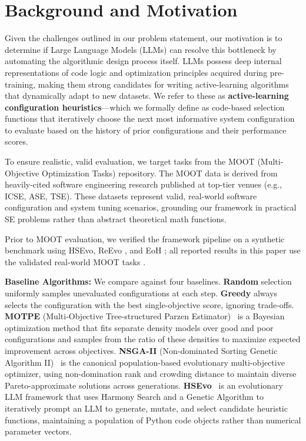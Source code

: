 \documentclass[sigconf,nonacm]{acmart}
\begin{document}
\section{Background and Motivation}

Given the challenges outlined in our problem statement, our motivation is to determine if Large Language Models (LLMs) can resolve this bottleneck by automating the algorithmic design process itself. LLMs possess deep internal representations of code logic and optimization principles acquired during pre-training, making them strong candidates for writing active-learning algorithms that dynamically adapt to new datasets. We refer to these as \textbf{active-learning configuration heuristics}---which we formally define as code-based selection functions that iteratively choose the next most informative system configuration to evaluate based on the history of prior configurations and their performance scores. 

To ensure realistic, valid evaluation, we target tasks from the MOOT (Multi-Objective Optimization Tasks) repository. The MOOT data is derived from heavily-cited software engineering research published at top-tier venues (e.g., ICSE, ASE, TSE). These datasets represent valid, real-world software configuration and system tuning scenarios, grounding our framework in practical SE problems rather than abstract theoretical math functions.

Prior to MOOT evaluation, we verified the framework pipeline on a synthetic benchmark using HSEvo, ReEvo \cite{reevo2024}, and EoH \cite{eoh2024}; all reported results in this paper use the validated real-world MOOT tasks \cite{menzies2024moot}.

\textbf{Baseline Algorithms:} We compare against four baselines. \textbf{Random} selection uniformly samples unevaluated configurations at each step. \textbf{Greedy} always selects the configuration with the best single-objective score, ignoring trade-offs. \textbf{MOTPE} (Multi-Objective Tree-structured Parzen Estimator)~\cite{optuna2019} is a Bayesian optimization method that fits separate density models over good and poor configurations and samples from the ratio of these densities to maximize expected improvement across objectives. \textbf{NSGA-II} (Non-dominated Sorting Genetic Algorithm II)~\cite{deb2002nsga2} is the canonical population-based evolutionary multi-objective optimizer, using non-domination rank and crowding distance to maintain diverse Pareto-approximate solutions across generations. \textbf{HSEvo}~\cite{dat2025hsevo} is an evolutionary LLM framework that uses Harmony Search and a Genetic Algorithm to iteratively prompt an LLM to generate, mutate, and select candidate heuristic functions, maintaining a population of Python code objects rather than numerical parameter vectors.
\end{document}
